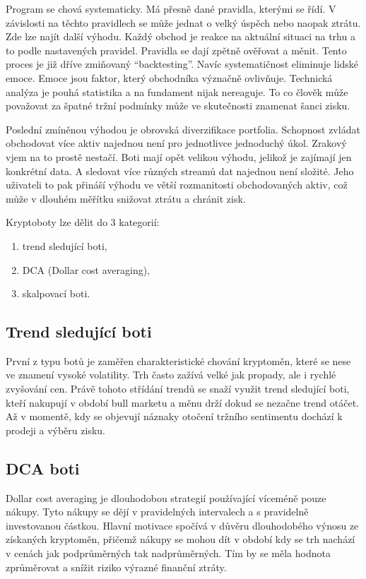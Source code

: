 Program se chová systematicky. Má přesně dané pravidla, kterými se řídí. V závislosti na těchto pravidlech se může jednat o velký úspěch nebo naopak ztrátu. Zde lze
najít další výhodu. Každý obchod je reakce na aktuální situaci na trhu a to podle nastavených pravidel. Pravidla se dají zpětně ověřovat a měnit. Tento proces je již
dříve zmiňovaný \enquote{backtesting}. Navíc systematičnost eliminuje lidské emoce. Emoce jsou faktor, který obchodníka význačně ovlivňuje. Technická analýza je pouhá
statistika a na fundament nijak nereaguje. To co člověk může považovat za špatné tržní podmínky může ve skutečnosti znamenat šanci zisku.

Poslední zmíněnou výhodou je obrovská diverzifikace portfolia. Schopnost zvládat obchodovat více aktiv najednou není pro jednotlivce jednoduchý úkol. Zrakový vjem
na to prostě nestačí. Boti mají opět velikou výhodu, jelikož je zajímají jen konkrétní data. A sledovat více různých streamů dat najednou není složité. Jeho uživateli
to pak přináší výhodu ve větší rozmanitosti obchodovaných aktiv, což může v dlouhém měřítku snižovat ztrátu a chránit zisk.

Kryptoboty lze dělit do 3 kategorií:
\begin{enumerate}
    \item trend sledující boti,
    \item DCA (Dollar cost averaging),
    \item skalpovací boti.
\end{enumerate}

\subsection{Trend sledující boti}
První z typu botů je zaměřen charakteristické chování kryptoměn, které se nese ve znamení vysoké volatility. Trh často zažívá velké jak propady, ale i rychlé zvyšování cen.
Právě tohoto střídání trendů se snaží využit trend sledující boti, kteří nakupují v období bull marketu a měnu drží dokud se nezačne trend otáčet. Až v momentě, kdy se objevují
náznaky otočení tržního sentimentu dochází k prodeji a výběru zisku.

\subsection{DCA boti}
Dollar cost averaging je dlouhodobou strategií používající víceméně pouze nákupy. Tyto nákupy se dějí v pravidelných intervalech a s pravidelně investovanou částkou.
Hlavní motivace spočívá v důvěru dlouhodobého výnosu ze získaných kryptoměn, přičemž nákupy se mohou dít v období kdy se trh nachází v cenách jak podprůměrných tak
nadprůměrných. Tím by se měla hodnota zprůměrovat a snížit riziko výrazné finanční ztráty.

